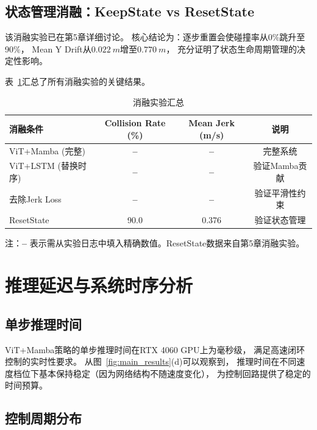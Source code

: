 \subsection{状态管理消融：KeepState vs ResetState}

该消融实验已在第5章详细讨论。
核心结论为：逐步重置会使碰撞率从0\%跳升至90\%，
Mean Y Drift从$\SI{0.022}{m}$增至$\SI{0.770}{m}$，
充分证明了状态生命周期管理的决定性影响。

表~\ref{tab:ablation_summary}汇总了所有消融实验的关键结果。

\begin{table}[htbp]
\centering
\caption{消融实验汇总}
\label{tab:ablation_summary}
\begin{tabular}{lccc}
\toprule
\textbf{消融条件} & \textbf{Collision Rate (\%)} & \textbf{Mean Jerk (m/s)} & \textbf{说明} \\
\midrule
ViT+Mamba (完整) & \textbf{--} & \textbf{--} & 完整系统 \\
ViT+LSTM (替换时序) & \textbf{--} & \textbf{--} & 验证Mamba贡献 \\
去除Jerk Loss & \textbf{--} & \textbf{--} & 验证平滑性约束 \\
ResetState & 90.0 & 0.376 & 验证状态管理 \\
\bottomrule
\end{tabular}
\begin{tablenotes}
\item {} 注：\textbf{--} 表示需从实验日志中填入精确数值。ResetState数据来自第5章消融实验。
\end{tablenotes}
\end{table}


\section{推理延迟与系统时序分析}

\subsection{单步推理时间}

ViT+Mamba策略的单步推理时间在RTX 4060 GPU上为毫秒级，
满足高速闭环控制的实时性要求。
从图~\ref{fig:main_results}(d)可以观察到，
推理时间在不同速度档位下基本保持稳定（因为网络结构不随速度变化），
为控制回路提供了稳定的时间预算。

\subsection{控制周期分布}

